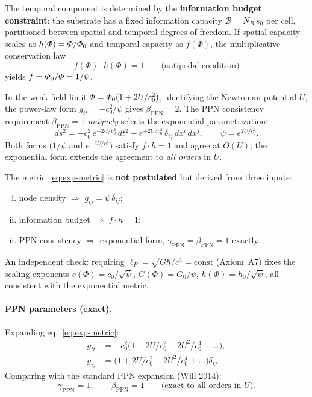 The temporal component is determined by the \textbf{information
budget constraint}: the substrate has a fixed information capacity
$\mathcal{B} = N_{B}\,s_{0}$ per cell, partitioned between spatial
and temporal degrees of freedom.  If spatial capacity scales as
$h(\varPhi)=\varPhi/\varPhi_0$ and temporal capacity as $f(\Phi)$, the
multiplicative conservation law
\begin{equation}\label{eq:fh-1}
  f(\Phi)\cdot h(\Phi) = 1
  \qquad\text{(antipodal condition)}
\end{equation}
yields $f = \varPhi_0/\varPhi = 1/\psi$.

In the weak-field limit $\varPhi = \varPhi_0(1+2U/c_{0}^{2})$,
identifying the Newtonian potential $U$, the power-law form
$g_{tt}=-c_{0}^{2}/\psi$ gives $\beta_{\mathrm{PPN}}=2$.
The PPN consistency requirement $\beta_{\mathrm{PPN}}=1$
\emph{uniquely} selects the exponential parametrization:
\begin{equation}\label{eq:exp-metric}
  \boxed{
    ds^{2}
    = -c_{0}^{2}\,e^{-2U/c_{0}^{2}}\,dt^{2}
    + e^{+2U/c_{0}^{2}}\,\delta_{ij}\,dx^{i}\,dx^{j},
    \qquad
    \psi = e^{2U/c_{0}^{2}}.
  }
\end{equation}
Both forms ($1/\psi$ and $e^{-2U/c_{0}^{2}}$) satisfy $f\cdot h=1$
and agree at $O(U)$; the exponential form extends the agreement to
\emph{all orders} in $U$.

\begin{remark}\label{rem:derivation-chain}
The metric~\eqref{eq:exp-metric} is \textbf{not postulated} but
derived from three inputs:
\begin{enumerate}[(i)]
  \item node density $\Rightarrow$ $g_{ij}=\psi\,\delta_{ij}$;
  \item information budget $\Rightarrow$ $f\cdot h=1$;
  \item PPN consistency $\Rightarrow$ exponential form,
        $\gamma_{\mathrm{PPN}}=\beta_{\mathrm{PPN}}=1$ exactly.
\end{enumerate}
An independent check: requiring $\ell_{P}=\sqrt{G\hbar/c^{3}}=\mathrm{const}$
(Axiom~A7) fixes the scaling exponents
$c(\Phi)=c_{0}/\sqrt{\psi}$, $G(\Phi)=G_{0}/\psi$,
$\hbar(\Phi)=\hbar_{0}/\sqrt{\psi}$,
all consistent with the exponential metric.
\end{remark}

\paragraph{PPN parameters (exact).}
Expanding eq.~\eqref{eq:exp-metric}:
\begin{align}
  g_{tt} &= -c_{0}^{2}\bigl(1 - 2U/c_{0}^{2} + 2U^{2}/c_{0}^{4} - \ldots\bigr), \\
  g_{ij} &= \bigl(1 + 2U/c_{0}^{2} + 2U^{2}/c_{0}^{4} + \ldots\bigr)\delta_{ij}.
\end{align}
Comparing with the standard PPN expansion (Will 2014):
\begin{equation}\label{eq:gamma-beta-exact}
  \gamma_{\mathrm{PPN}} = 1, \qquad \beta_{\mathrm{PPN}} = 1
  \qquad\text{(exact to all orders in $U$)}.
\end{equation}

